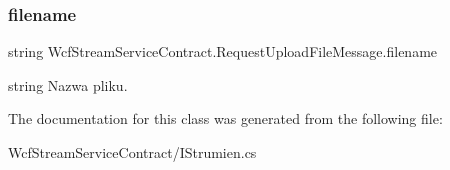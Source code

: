 \subsubsection{\texorpdfstring{filename}{filename}}
{\footnotesize\ttfamily string Wcf\+Stream\+Service\+Contract.\+Request\+Upload\+File\+Message.\+filename}



string Nazwa pliku. 



The documentation for this class was generated from the following file\+:\begin{DoxyCompactItemize}
\item 
Wcf\+Stream\+Service\+Contract/I\+Strumien.\+cs\end{DoxyCompactItemize}

